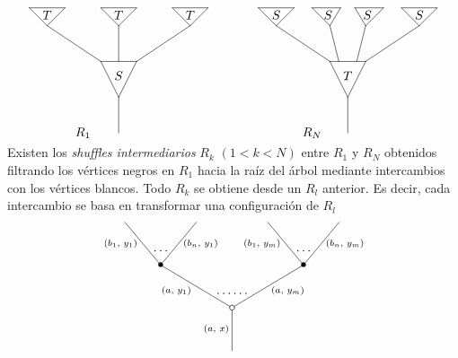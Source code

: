 \documentclass[../main.tex]{subfiles}
\begin{document}
$$
    \xy<0.1cm, 0cm>:
    (0,0)*=0{}="1";
    (0,10)*=0{}="2";
    (-0,20)*=0{}="a";
    (-5,20)*=0{}="3";
    (5,20)*=0{}="4";
    (-20,30)*=0{}="5";
    (20,30)*=0{}="6";
    (0,30)*=0{}="b";
    (0,16)*=0{S};
    "1";"2" **\dir{-};
    "2";"3" **\dir{-};
    "2";"4" **\dir{-};
    "3";"4" **\dir{-};
    "3";"5" **\dir{-};
    "4";"6" **\dir{-};
    "a";"b" **\dir{-};
    (-25,35)*=0{}="9";
    (-15,35)*=0{}="10";
    (-5,35)*=0{}="11";
    (5,35)*=0{}="12";
    (15,35)*=0{}="15";
    (25,35)*=0{}="16";
    "5";"9" **\dir{-};
    "5";"10" **\dir{-};
    "9";"10" **\dir{-};
    "b";"11" **\dir{-};
    "b";"12" **\dir{-};
    "11";"12" **\dir{-};
    "6";"15" **\dir{-};
    "6";"16" **\dir{-};
    "15";"16" **\dir{-};
    (-20,33)*=0{T};
    (0,33)*=0{T};
    (20,33)*=0{T};
    (-10,0)*=0{R_1};
    \endxy
    \qquad
    \qquad
    \xy<0.1cm, 0cm>:
    (0,0)*=0{}="1";
    (0,10)*=0{}="2";
    (-2.5,20)*=0{}="a";
    (2.5,20)*=0{}="b";
    (-5,20)*=0{}="3";
    (5,20)*=0{}="4";
    (-20,30)*=0{}="5";
    (20,30)*=0{}="6";
    (-5,30)*=0{}="c";
    (5,30)*=0{}="d";
    (0,16)*=0{T};
    "1";"2" **\dir{-};
    "2";"3" **\dir{-};
    "2";"4" **\dir{-};
    "3";"4" **\dir{-};
    "3";"5" **\dir{-};
    "4";"6" **\dir{-};
    "a";"c" **\dir{-};
    "b";"d" **\dir{-};
    (-25,35)*=0{}="9";
    (-15,35)*=0{}="10";
    (-10,35)*=0{}="11";
    (-2,35)*=0{}="12";
    (2,35)*=0{}="13";
    (10,35)*=0{}="14";
    (15,35)*=0{}="15";
    (25,35)*=0{}="16";
    "5";"9" **\dir{-};
    "5";"10" **\dir{-};
    "9";"10" **\dir{-};
    "c";"11" **\dir{-};
    "c";"12" **\dir{-};
    "11";"12" **\dir{-};
    "d";"13" **\dir{-};
    "d";"14" **\dir{-};
    "13";"14" **\dir{-};
    "6";"15" **\dir{-};
    "6";"16" **\dir{-};
    "15";"16" **\dir{-};
    (-20,33)*=0{S};
    (-5.5,33)*=0{S};
    (5.5,33)*=0{S};
    (20,33)*=0{S};
    (-10,0)*=0{R_N};
    \endxy
$$
Existen los \emph{shuffles intermediarios} $R_k$ $(1 < k < N)$ entre $R_1$ y $R_N$ obtenidos filtrando los v\'ertices negros en $R_1$ hacia la ra\'iz del \'arbol mediante intercambios con los v\'ertices blancos.
Todo $R_k$ se obtiene desde un $R_l$ anterior. Es decir, cada intercambio se basa en transformar una configuraci\'on de $R_l$
\begin{equation}
    \xy
    <0.08cm, 0cm>:
    (0.0, 0.0)*{}="1"; %
    (0.0, 15.0)*\cir<2pt>{}="2"; %
    (-25.0, 30.0)*=0{\bullet}="3"; %
    (-37.5, 45.0)*{}="4"; %
    (-12.5, 45.0)*{}="5"; %
    (25.0, 30.0)*=0{\bullet}="6"; %
    (12.5, 45.0)*{}="7"; %
    (37.5, 45.0)*{}="8"; %
    "1";"2" **\dir{-};
    "2";"3" **\dir{-};
    "3";"4" **\dir{-};
    "3";"5" **\dir{-};
    "2";"6" **\dir{-};
    "6";"7" **\dir{-};
    "6";"8" **\dir{-};
    (-5.5, 7.5)*=0{\scriptstyle (a,\text{ }x)};
    (-19.5, 21)*=0{\scriptstyle (a,\text{ }y_1)};
    (-39, 37.5)*=0{\scriptstyle (b_1,\text{ }y_1)};
    (-11, 37.5)*=0{\scriptstyle (b_n,\text{ }y_1)};
    (19.5, 21)*=0{\scriptstyle (a,\text{ }y_m)};
    (10.5, 37.5)*=0{\scriptstyle (b_1,\text{ }y_m)};
    (39.5, 37.5)*=0{\scriptstyle (b_n,\text{ }y_m)};
    (-25,35)*{\dots};
    (25,35)*{\dots};
    (0,20)*{\dots\dots};
    \endxy
\end{equation}
\end{document}
